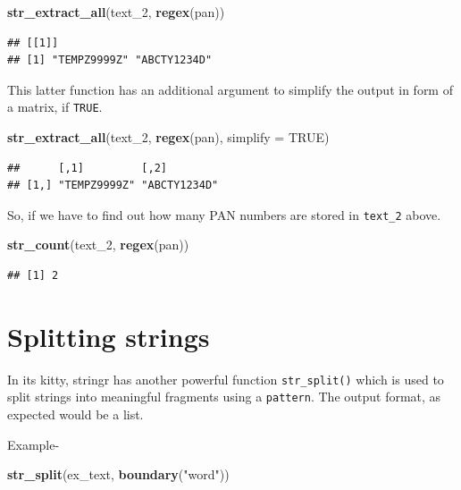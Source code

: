 \documentclass[
]{book}
\newenvironment{Shaded}{\begin{snugshade}}{\end{snugshade}}
\newcommand{\AttributeTok}[1]{\textcolor[rgb]{0.13,0.29,0.53}{#1}}
\newcommand{\ConstantTok}[1]{\textcolor[rgb]{0.56,0.35,0.01}{#1}}
\newcommand{\FunctionTok}[1]{\textcolor[rgb]{0.13,0.29,0.53}{\textbf{#1}}}
\newcommand{\NormalTok}[1]{#1}
\newcommand{\StringTok}[1]{\textcolor[rgb]{0.31,0.60,0.02}{#1}}
\begin{document}
\begin{Shaded}
\begin{Highlighting}[]
\FunctionTok{str\_extract\_all}\NormalTok{(text\_2, }\FunctionTok{regex}\NormalTok{(pan))}
\end{Highlighting}
\end{Shaded}

\begin{verbatim}
## [[1]]
## [1] "TEMPZ9999Z" "ABCTY1234D"
\end{verbatim}

This latter function has an additional argument to simplify the output in form of a matrix, if \texttt{TRUE}.

\begin{Shaded}
\begin{Highlighting}[]
\FunctionTok{str\_extract\_all}\NormalTok{(text\_2, }\FunctionTok{regex}\NormalTok{(pan), }\AttributeTok{simplify =} \ConstantTok{TRUE}\NormalTok{)}
\end{Highlighting}
\end{Shaded}

\begin{verbatim}
##      [,1]         [,2]        
## [1,] "TEMPZ9999Z" "ABCTY1234D"
\end{verbatim}

So, if we have to find out how many PAN numbers are stored in \texttt{text\_2} above.

\begin{Shaded}
\begin{Highlighting}[]
\FunctionTok{str\_count}\NormalTok{(text\_2, }\FunctionTok{regex}\NormalTok{(pan))}
\end{Highlighting}
\end{Shaded}

\begin{verbatim}
## [1] 2
\end{verbatim}

\hypertarget{splitting-strings}{%
\section{Splitting strings}\label{splitting-strings}}

In its kitty, stringr has another powerful function \texttt{str\_split()} which is used to split strings into meaningful fragments using a \texttt{pattern}. The output format, as expected would be a list.

Example-

\begin{Shaded}
\begin{Highlighting}[]
\FunctionTok{str\_split}\NormalTok{(ex\_text, }\FunctionTok{boundary}\NormalTok{(}\StringTok{"word"}\NormalTok{))}
\end{Highlighting}
\end{Shaded}
\end{document}
